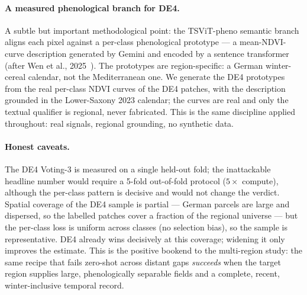 \paragraph{A measured phenological branch for DE4.}
A subtle but important methodological point: the TSViT-pheno semantic branch aligns each
pixel against a per-class phenological prototype --- a mean-NDVI-curve description generated by
Gemini and encoded by a sentence transformer (after Wen et al.,
2025~\cite{wen2025phenology}). The prototypes are region-specific: a German winter-cereal
calendar, not the Mediterranean one. We generate the DE4 prototypes from the real per-class
NDVI curves of the DE4 patches, with the description grounded in the Lower-Saxony 2023
calendar; the curves are real and only the textual qualifier is regional, never fabricated.
This is the same discipline applied throughout: real signals, regional grounding, no
synthetic data.

\paragraph{Honest caveats.}
The DE4 Voting-3 is measured on a single held-out fold; the inattackable headline number
would require a 5-fold out-of-fold protocol ($5\times$ compute), although the per-class
pattern is decisive and would not change the verdict. Spatial coverage of the DE4 sample is
partial --- German parcels are large and dispersed, so the labelled patches cover a fraction
of the regional universe --- but the per-class loss is uniform across classes (no selection
bias), so the sample is representative. DE4 already wins decisively at this coverage; widening
it only improves the estimate. This is the positive bookend to the multi-region study: the
same recipe that fails zero-shot across distant gaps \emph{succeeds} when the target region
supplies large, phenologically separable fields and a complete, recent, winter-inclusive
temporal record.
